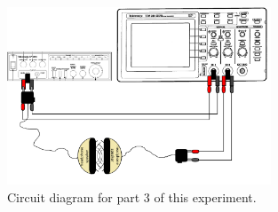\begin{figure}[h!]
        \centering
            \includegraphics[width=0.7\textwidth]{./Exp9/pic/part3.pdf}
        \caption{Circuit diagram for part 3 of this experiment.}
        \label{fig:part3}
\end{figure}

